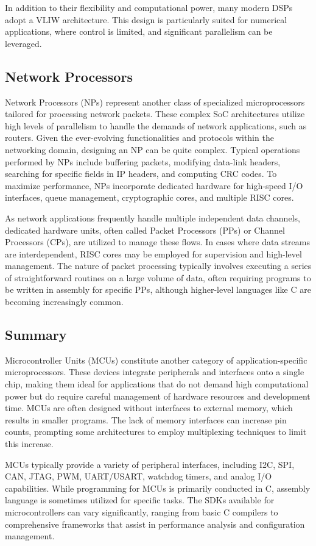 In addition to their flexibility and computational power, many modern DSPs adopt a VLIW architecture. 
This design is particularly suited for numerical applications, where control is limited, and significant parallelism can be leveraged.

\subsection{Network Processors}
Network Processors (NPs) represent another class of specialized microprocessors tailored for processing network packets. 
These complex SoC architectures utilize high levels of parallelism to handle the demands of network applications, such as routers. 
Given the ever-evolving functionalities and protocols within the networking domain, designing an NP can be quite complex.
Typical operations performed by NPs include buffering packets, modifying data-link headers, searching for specific fields in IP headers, and computing CRC codes.
To maximize performance, NPs incorporate dedicated hardware for high-speed I/O interfaces, queue management, cryptographic cores, and multiple RISC cores.

As network applications frequently handle multiple independent data channels, dedicated hardware units, often called Packet Processors (PPs) or Channel Processors (CPs), are utilized to manage these flows. 
In cases where data streams are interdependent, RISC cores may be employed for supervision and high-level management. 
The nature of packet processing typically involves executing a series of straightforward routines on a large volume of data, often requiring programs to be written in assembly for specific PPs, although higher-level languages like C are becoming increasingly common.

\subsection{Summary}
Microcontroller Units (MCUs) constitute another category of application-specific microprocessors. 
These devices integrate peripherals and interfaces onto a single chip, making them ideal for applications that do not demand high computational power but do require careful management of hardware resources and development time. 
MCUs are often designed without interfaces to external memory, which results in smaller programs. 
The lack of memory interfaces can increase pin counts, prompting some architectures to employ multiplexing techniques to limit this increase.

MCUs typically provide a variety of peripheral interfaces, including I2C, SPI, CAN, JTAG, PWM, UART/USART, watchdog timers, and analog I/O capabilities. 
While programming for MCUs is primarily conducted in C, assembly language is sometimes utilized for specific tasks. 
The SDKs available for microcontrollers can vary significantly, ranging from basic C compilers to comprehensive frameworks that assist in performance analysis and configuration management.